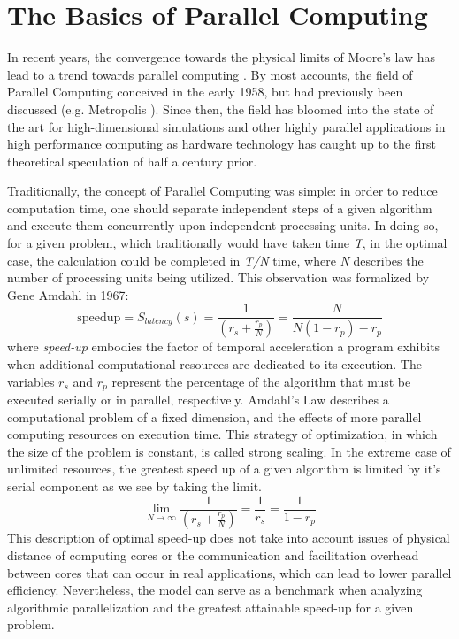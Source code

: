 \section{The Basics of Parallel Computing}
In recent years, the convergence towards the physical limits of Moore's law has lead to a
trend towards parallel computing \cite{Kumar}\cite{Markov}.  By most accounts, the
field of Parallel Computing conceived in the early 1958\cite{Gill}, but had previously
been discussed (e.g. Metropolis \cite{Metropolis}). Since then, the field has
 bloomed into the state of the art for high-dimensional simulations and
 other highly parallel applications in
high performance computing as hardware technology has caught up to the first
theoretical speculation of half a century prior. \par

Traditionally, the concept of Parallel Computing was simple: in order to
reduce computation time, one should separate independent steps of a given algorithm
and execute them concurrently upon independent processing units.  In doing so, for a given
problem, which traditionally would have taken time \textit{T}, in the optimal case,
the calculation could be completed in \textit{T/N} time, where \textit{N} describes
the number of processing units being utilized.  This observation was formalized
by Gene Amdahl in 1967\cite{Wilt}:
%
\begin{equation}
  \tag{Amdahl's Law}
  \text{speedup} = S_{latency}(s)= \frac{1}{(r_{s} + \frac{r_{p}}{N})} = \frac{N}{N(1-r_{p})-r_{p}}
  \label{egn:Amdahl}
\end{equation}
%
where \textit{\gls{speed-up}} embodies the factor of temporal acceleration a program
exhibits when additional computational resources are dedicated to its execution.
The variables \textit{$r_{s}$} and \textit{$ r_{p} $} represent the percentage of
 the algorithm that must be executed serially or in parallel, respectively.
   Amdahl's Law describes a computational problem of a fixed dimension,
and the effects of more parallel computing resources on execution time.
This strategy of optimization, in which the size of the problem is constant,
 is called strong scaling.
In the extreme case of unlimited resources, the greatest speed up of a given algorithm
 is limited by it's serial component as we see by taking the limit.
%
\begin{equation}
 \lim_{N\to\infty}  \frac{1}{(r_{s} + \frac{r_{p}}{N})} = \frac{1}{r_{s}} = \frac{1}{1-r_{p}}
\end{equation}
%
This description of optimal \gls{speed-up} does not take into account issues of physical
distance of computing cores or the communication and facilitation overhead between
cores that can occur in real applications, which can lead to lower parallel efficiency.
Nevertheless, the model can serve as a benchmark when analyzing algorithmic
parallelization and the greatest attainable speed-up for a given problem.\par

